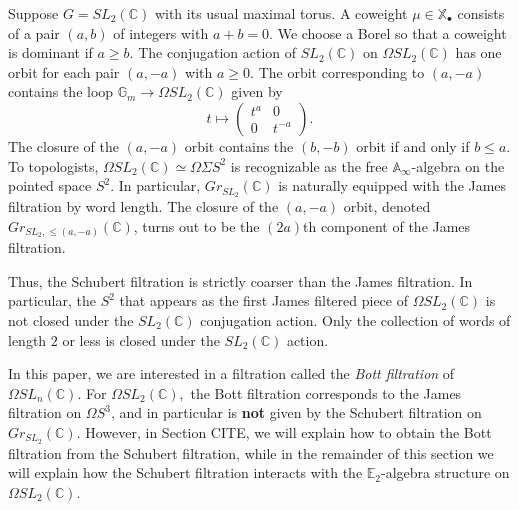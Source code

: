 \begin{exm} \label{sl2example}
Suppose $G=SL_2(\mathbb{C})$ with its usual maximal torus.  A coweight $\mu \in \mathbb{X}_\bullet$ consists of a pair $(a,b)$ of integers with $a+b=0$.  We choose a Borel so that a coweight is dominant if $a \ge b$.  The conjugation action of $SL_2(\mathbb{C})$ on $\Omega SL_2(\mathbb{C})$ has one orbit for each pair $(a,-a)$ with $a \ge 0$.  The orbit corresponding to $(a,-a)$ contains the loop $\mathbb{G}_m \rightarrow \Omega SL_2(\mathbb{C})$ given by
$$
t \mapsto \left( \begin{array}{cc} t^a & 0 \\ 0 & t^{-a}  \end{array} \right).
$$
The closure of the $(a,-a)$ orbit contains the $(b,-b)$ orbit if and only if $b \le a$.  To topologists, $\Omega SL_2(\mathbb{C}) \simeq \Omega \Sigma S^2$ is recognizable as the free $\mathbb{A}_\infty$-algebra on the pointed space $S^2$.  In particular, $Gr_{SL_2}(\mathbb{C})$ is naturally equipped with the James filtration by word length.  The closure of the $(a,-a)$ orbit, denoted $Gr_{SL_2,\le (a,-a)}(\mathbb{C})$, turns out to be the $(2a)$th component of the James filtration.

Thus, the Schubert filtration is strictly coarser than the James filtration.  In particular, the $S^2$ that appears as the first James filtered piece of $\Omega SL_2(\mathbb{C})$ is not closed under the $SL_2(\mathbb{C})$ conjugation action.  Only the collection of words of length $2$ or less is closed under the $SL_2(\mathbb{C})$ action.

In this paper, we are interested in a filtration called the \emph{Bott filtration} of $\Omega SL_n(\mathbb{C}).$  For $\Omega SL_2(\mathbb{C}),$ the Bott filtration corresponds to the James filtration on $\Omega S^3$, and in particular is \textbf{not} given by the Schubert filtration on $Gr_{SL_2}(\mathbb{C})$.  However, in Section CITE, we will explain how to obtain the Bott filtration from the Schubert filtration, while in the remainder of this section we will explain how the Schubert filtration interacts with the $\mathbb{E}_2$-algebra structure on $\Omega SL_2(\mathbb{C})$.
\end{exm}


